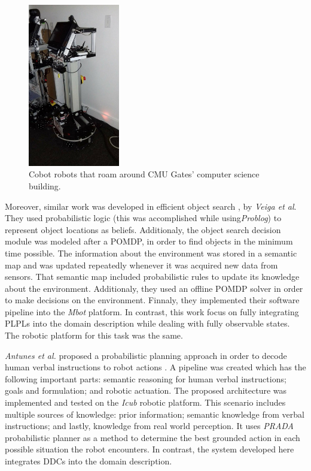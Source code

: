 \begin{figure}[H]
    \centering
        \includegraphics[width=4cm]{images/cobot}
        \caption{Cobot robots that roam around \gls{CMU} Gates' computer science
        building.}
        \label{fig:cobot}
\end{figure}

Moreover, similar work was developed in efficient object search \cite{veiga2016efficient},
by \textit{Veiga et al}. They used probabilistic logic (this was accomplished
while using\textit{Problog}) to represent object locations
as beliefs. Additionaly, the object search decision module was modeled after a
\gls{POMDP}, in order to find objects in the minimum time possible.
The information about the environment was stored in a semantic map and was
updated repeatedly whenever it was acquired new data from sensors. That semantic
map included probabilistic rules to update its knowledge about the environment.
Additionaly, they used an offline \gls{POMDP} solver in order to
make decisions on the environment. Finnaly, they implemented their software pipeline into the 
\textit{Mbot} platform.
In contrast, this work focus on fully integrating \glspl{PLPL} into 
the domain description while dealing with fully observable states. The robotic platform for this
task was the same.

\textit{Antunes et al.} proposed a probabilistic planning approach 
in order to decode human verbal instructions to robot actions \cite{antunes2016human}. 
A pipeline was created which has the following important parts: semantic reasoning for human
verbal instructions; goals and formulation; and robotic actuation. The proposed
architecture was implemented and tested on the \textit{Icub} robotic platform.
This scenario includes multiple sources of knowledge: prior information;
semantic knowledge from verbal instructions; and lastly, knowledge from real
world perception. It uses \textit{PRADA} probabilistic planner as a method to
determine the best grounded action in each possible situation the robot encounters.
In contrast, the system developed here integrates \glspl{DDC} into the domain description.

